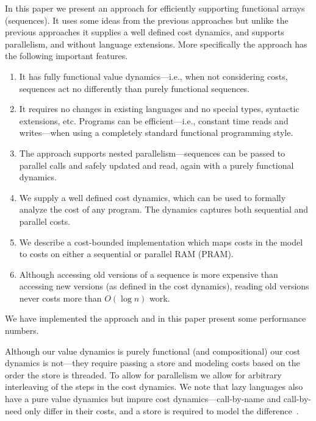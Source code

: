 In this paper we present an approach for efficiently supporting
functional arrays (sequences).  It uses some ideas from the previous approaches
but unlike the previous approaches it supplies a well
defined cost dynamics, and supports parallelism, and without language
extensions.  More specifically the approach has the
following important features.
\begin{enumerate}
\item It has fully functional value dynamics---i.e., when not considering costs, sequences act no
  differently than purely functional sequences.
\item It requires no changes in existing languages and no special
  types, syntactic extensions, etc.  Programs can be efficient---i.e.,
  constant time reads and writes---when using a completely standard
  functional programming style.
\item The approach supports nested parallelism---sequences can be passed
  to parallel calls and safely updated and read, again with a purely
  functional dynamics.
\item We supply a well defined cost dynamics, which can be used to
  formally analyze the cost of any program.  The dynamics captures
  both sequential and parallel costs.
\item We describe a cost-bounded implementation which maps costs in the
  model to costs on either a sequential or parallel RAM (PRAM).
\item
Although accessing old versions of a sequence is more expensive than
accessing new versions (as defined in the cost dynamics), reading old
versions never costs more than $O(\log n)$ work.
\end{enumerate}
We have implemented the approach and in this paper present some
performance numbers.

Although our value dynamics is purely functional (and compositional)
our cost dynamics is not---they require passing a store and modeling
costs based on the order the store is threaded.  To allow for
parallelism we allow for arbitrary interleaving of the steps in the
cost dynamics.  We note that lazy languages also have a pure value
dynamics but impure cost dynamics---call-by-name and call-by-need
only differ in their costs, and a store is required to model the
difference~\cite{AMOFW95}.

